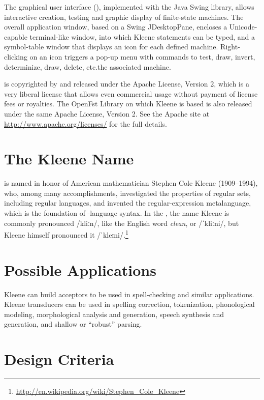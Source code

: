 The \Kleene{} graphical user interface (), implemented with 
the Java Swing library, 
allows interactive creation, testing and graphic display
of finite-state machines.  The overall application window, based on a Swing JDesktopPane,
encloses a Unicode-capable terminal-like window, into which Kleene statements
can be typed,
and a symbol-table window that displays an icon for each defined
machine.  Right-clicking on an icon triggers a pop-up menu with
commands to test, draw, invert, determinize, draw, delete, 
etc.\@ the associated machine.

\Kleene{} is copyrighted by   and released under the Apache License, Version 2, which
is a very liberal license that allows even commercial usage without payment of license fees or
royalties.  The OpenFst Library on which Kleene is based is also released under the same Apache License,
Version 2.  See the Apache site at \url{http://www.apache.org/licenses/} for the full details.

\section{The Kleene Name}

\Kleene{} is named in honor of American mathematician Stephen Cole Kleene
(1909--1994), who, among many accomplishments, investigated the properties of regular sets, including
regular languages, and invented the regular-expression metalanguage, which is the foundation of
\Kleene{}-language syntax.  In the , the name Kleene is
commonly pronounced /kliːn/, like the English word \emph{clean}, 
or /ˈkliːni/, but Kleene himself pronounced it
/ˈkleɪni/.\footnote{\url{http://en.wikipedia.org/wiki/Stephen_Cole_Kleene}}

\section{Possible Applications}

Kleene can build acceptors to be used in spell-checking and similar
applications.  Kleene transducers can be used in spelling correction,
tokenization, phonological modeling, morphological analysis and
generation, speech synthesis and generation, and shallow or ``robust''
parsing.

\section{Design Criteria}


